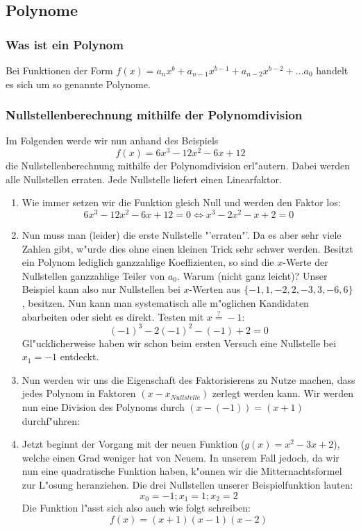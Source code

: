 \subsection{Polynome}
\subsubsection{Was ist ein Polynom}
Bei Funktionen der Form $f(x) = a_n x^b + a_{n-1} x^{b-1} + a_{n-2} x^{b-2} + ... a_0$ handelt es sich um so genannte Polynome.

\subsubsection{Nullstellenberechnung mithilfe der Polynomdivision}
Im Folgenden werde wir nun anhand des Beispiels 
\begin{equation*}
f(x) = 6x^3 - 12x^2 - 6x + 12
\end{equation*}
die Nullstellenberechnung mithilfe der Polynomdivision erl"autern. Dabei werden alle Nullstellen erraten. Jede Nullstelle liefert einen Linearfaktor. 
\begin{enumerate}
\item Wie immer setzen wir die Funktion gleich Null und werden den Faktor los:
\begin{equation*}
6x^3 - 12x^2 - 6x + 12 = 0 \iff x^3 -2x^2 - x + 2 = 0
\end{equation*}

\item Nun muss man (leider) die erste Nullstelle "'erraten"'. Da es aber sehr viele Zahlen gibt, w"urde dies ohne einen kleinen Trick sehr schwer werden. Besitzt ein Polynom lediglich ganzzahlige Koeffizienten, so sind die $x$-Werte der Nullstellen ganzzahlige Teiler von $a_0$. Warum (nicht ganz leicht)? Unser Beispiel kann also nur Nullstellen bei $x$-Werten aus $\{-1,1,-2,2,-3,3,-6, 6\}$, besitzen. Nun kann man systematisch alle m"oglichen Kandidaten abarbeiten oder sieht es direkt. Testen mit $x \stackrel{?}{=} -1$:
\begin{equation*}
(-1)^3 - 2(-1)^2 - (-1) + 2 = 0
\end{equation*}
Gl"ucklicherweise haben wir schon beim ersten Versuch eine Nullstelle bei $x_1 = -1$ entdeckt.
\item Nun werden wir uns die Eigenschaft des Faktorisierens zu Nutze machen, dass jedes Polynom in Faktoren $(x-x_{Nullstelle})$ zerlegt werden kann. Wir werden nun eine Division des Polynoms durch $(x-(-1)) = (x + 1)$ durchf"uhren:

\item Jetzt beginnt der Vorgang mit der neuen Funktion ($g(x) = x^2 - 3x + 2$), welche einen Grad weniger hat von Neuem. In unserem Fall jedoch, da wir nun eine quadratische Funktion haben, k"onnen wir die Mitternachtsformel zur L"osung heranziehen. Die drei Nullstellen unserer Beispielfunktion lauten:
\begin{equation*}
x_0 = -1; x_1 = 1; x_2 = 2
\end{equation*}
Die Funktion l"asst sich also auch wie folgt schreiben:
\begin{equation*}
f(x)=(x+1)(x-1)(x-2)
\end{equation*}
\end{enumerate}
